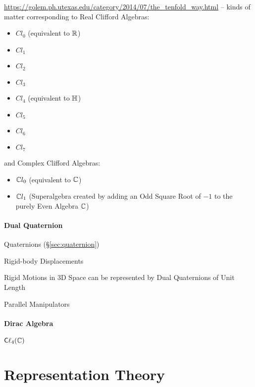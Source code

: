 \url{https://golem.ph.utexas.edu/category/2014/07/the_tenfold_way.html} -- kinds
of matter corresponding to Real Clifford Algebras:
\begin{itemize}
\item $Cl_0$ (equivalent to $\mathbb{R}$)
\item $Cl_1$
\item $Cl_2$
\item $Cl_3$
\item $Cl_4$ (equivalent to $\mathbb{H}$)
\item $Cl_5$
\item $Cl_6$
\item $Cl_7$
\end{itemize}
and Complex Clifford Algebras:
\begin{itemize}
\item $\mathbb{C}{l}_0$ (equivalent to $\mathbb{C}$)
\item $\mathbb{C}{l}_1$ (Superalgebra created by adding an Odd Square Root of $-1$
  to the purely Even Algebra $\mathbb{C}$)
\end{itemize}



\paragraph{Dual Quaternion}\label{sec:dual_quaternion}\hfill

\fist Quaternions (\S\ref{sec:quaternion})

Rigid-body Displacements

Rigid Motions in 3D Space can be represented by Dual Quaternions of Unit Length

Parallel Manipulators



\paragraph{Dirac Algebra}\label{sec:dirac_algebra}\hfill

$\mathsf{C}\ell_4(\mathbb{C})$



\section{Representation Theory}\label{sec:representation_theory}


